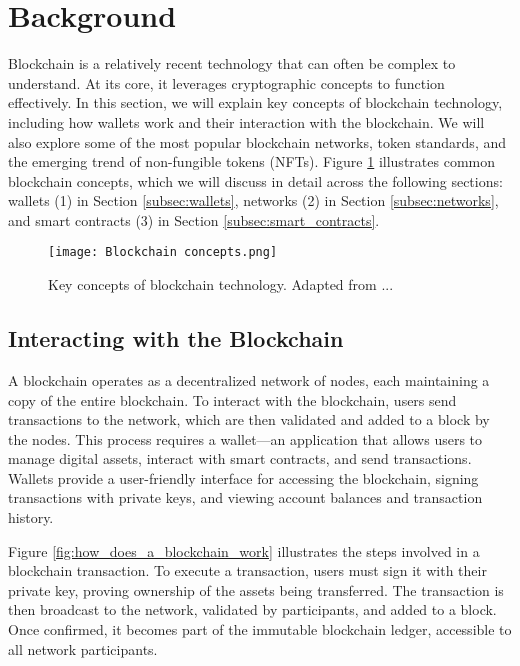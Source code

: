 \section{Background}
\label{sec:background}

Blockchain is a relatively recent technology that can often be complex to
understand. At its core, it leverages cryptographic concepts to function
effectively. In this section, we will explain key concepts of blockchain
technology, including how wallets work and their interaction with the
blockchain. We will also explore some of the most popular blockchain networks,
token standards, and the emerging trend of non-fungible tokens (NFTs). Figure
\ref{fig:blockchain_concepts} illustrates common blockchain concepts, which we
will discuss in detail across the following sections: wallets (1) in Section
\ref{subsec:wallets}, networks (2) in Section \ref{subsec:networks}, and smart
contracts (3) in Section \ref{subsec:smart_contracts}.

\begin{figure}[H]
    \centering
    \texttt{[image: Blockchain concepts.png]}
    \caption[Blockchain concepts]{Key concepts of blockchain technology. Adapted from ...}
    \label{fig:blockchain_concepts}
\end{figure}

\subsection{Interacting with the Blockchain}
\label{subsec:interacting_with_the_blockchain}

A blockchain operates as a decentralized network of nodes, each maintaining a
copy of the entire blockchain. To interact with the blockchain, users send
transactions to the network, which are then validated and added to a block by
the nodes. This process requires a wallet—an application that allows users to
manage digital assets, interact with smart contracts, and send transactions.
Wallets provide a user-friendly interface for accessing the blockchain, signing
transactions with private keys, and viewing account balances and transaction
history.

Figure \ref{fig:how_does_a_blockchain_work} illustrates the steps involved in a
blockchain transaction. To execute a transaction, users must sign it with their
private key, proving ownership of the assets being transferred. The transaction
is then broadcast to the network, validated by participants, and added to a
block. Once confirmed, it becomes part of the immutable blockchain ledger,
accessible to all network participants.

